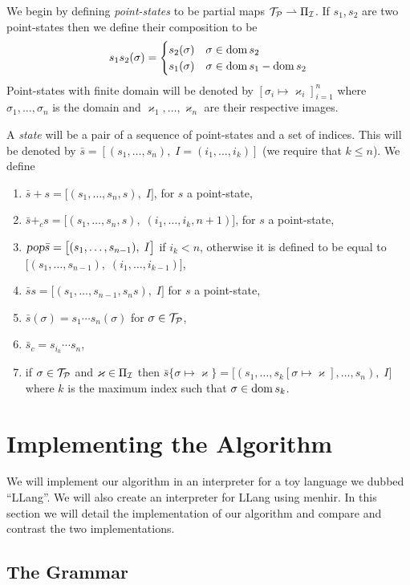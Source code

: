 \documentclass{llncs}
\newcounter{algo}
\begin{document}
We begin by defining \textit{point-states} to be partial maps $\mathcal T_{\mathcal P}\rightharpoonup\Pi_{\mathcal I}$.
If $s_1,s_2$ are two point-states then we define their composition to be
\[ s_1s_2(\sigma) = \begin{cases} s_2(\sigma) & \sigma\in\operatorname{dom} s_2\\ s_1(\sigma) & \sigma\in\operatorname{dom} s_1-\operatorname{dom} s_2\end{cases} \]
Point-states with finite domain will be denoted by $[\sigma_i\mapsto\varkappa_i]_{i=1}^n$ where $\sigma_1,\dots,\sigma_n$ is the domain and $\varkappa_1,\dots,\varkappa_n$ are their respective images.

A \textit{state} will be a pair of a sequence of point-states and a set of indices.
This will be denoted by $\bar s=[(s_1,\dots,s_n),\;I=(i_1,\dots,i_k)]$ (we require that $k\leq n$).
We define
\begin{enumerate}
    \item $\bar s+s=\bigl[(s_1,\dots,s_n,s),\;I\bigr]$, for $s$ a point-state,
    \item $\bar s+_cs=\bigl[(s_1,\dots,s_n,s),\;(i_1,\dots,i_k,n+1)\bigr]$, for $s$ a point-state,
    \item $\textsl{pop}\bar s=\bigl[(s_1,\dots,s_{n-1}),\;I\bigr]$ if $i_k<n$, otherwise it is defined to be equal to $\bigl[(s_1,\dots,s_{n-1}),\;(i_1,\dots,i_{k-1})\bigr]$,
    \item $\bar ss=\bigl[(s_1,\dots,s_{n-1},s_ns),\;I\bigr]$ for $s$ a point-state,
    \item $\bar s(\sigma)=s_1\cdots s_n(\sigma)$ for $\sigma\in\mathcal T_{\mathcal P}$,
    \item $\bar s_c=s_{i_k}\cdots s_n$,
    \item if $\sigma\in\mathcal T_{\mathcal P}$ and $\varkappa\in\Pi_{\mathcal I}$ then $\bar s\{\sigma\mapsto\varkappa\}=\bigl[(s_1,\dots,s_k[\sigma\mapsto\varkappa],\dots,s_n),\;I\bigr]$ where $k$ is the maximum index such that
    $\sigma\in\operatorname{dom} s_k$.
\end{enumerate}

\section{Implementing the Algorithm}

We will implement our algorithm in an interpreter for a toy language we dubbed ``LLang''.
We will also create an interpreter for LLang using menhir\NEEDCITE{}.
In this section we will detail the implementation of our algorithm and compare and contrast the two implementations.

\subsection{The Grammar}
\end{document}
